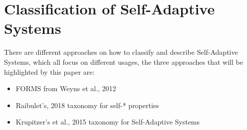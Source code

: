 \newpage
\section{Classification of Self-Adaptive Systems}
\label{ch:SASClassification}




There are different approaches on how to classify and describe Self-Adaptive Systems,
which all focus on different usages, the three approaches that will be highlighted by this paper are:
\begin{itemize}
    \item FORMS from Weyns et al., 2012 \cite*{FORMS}
    \item Raibulet's, 2018 taxonomy for self-* properties \cite*{TaxonomyOfSelfSoftware}
    \item Krupitzer's et al., 2015 taxonomy for Self-Adaptive Systems \cite*{SurveyOnEngineeringApproaches}
\end{itemize} 

